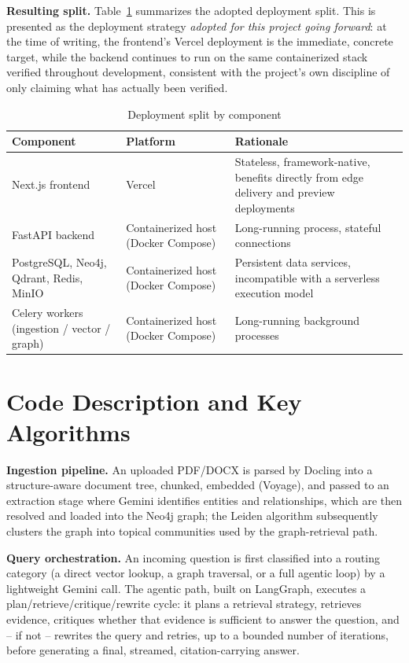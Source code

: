 \documentclass[12pt,a4paper]{report}
\begin{document}
\textbf{Resulting split.} Table~\ref{tab:deployment} summarizes the adopted
deployment split. This is presented as the deployment strategy \emph{adopted
for this project going forward}: at the time of writing, the frontend's
Vercel deployment is the immediate, concrete target, while the backend
continues to run on the same containerized stack verified throughout
development, consistent with the project's own discipline of only claiming
what has actually been verified.

\begin{table}[H]
\centering
\caption{Deployment split by component}
\label{tab:deployment}
\begin{tabularx}{\textwidth}{@{}l X l@{}}
\toprule
\textbf{Component} & \textbf{Platform} & \textbf{Rationale} \\
\midrule
Next.js frontend & Vercel & Stateless, framework-native, benefits directly from edge delivery and preview deployments \\
FastAPI backend & Containerized host (Docker Compose) & Long-running process, stateful connections \\
PostgreSQL, Neo4j, Qdrant, Redis, MinIO & Containerized host (Docker Compose) & Persistent data services, incompatible with a serverless execution model \\
Celery workers (ingestion / vector / graph) & Containerized host (Docker Compose) & Long-running background processes \\
\bottomrule
\end{tabularx}
\end{table}

\section{Code Description and Key Algorithms}
\label{sec:code-description}

\textbf{Ingestion pipeline.} An uploaded \ac{PDF}/DOCX is parsed by Docling
into a structure-aware document tree, chunked, embedded (Voyage), and passed
to an extraction stage where Gemini identifies entities and relationships,
which are then resolved and loaded into the Neo4j graph; the Leiden
algorithm subsequently clusters the graph into topical communities used by
the graph-retrieval path.

\textbf{Query orchestration.} An incoming question is first classified into
a routing category (a direct vector lookup, a graph traversal, or a full
agentic loop) by a lightweight Gemini call. The agentic path, built on
LangGraph, executes a plan/retrieve/critique/rewrite cycle: it plans a
retrieval strategy, retrieves evidence, critiques whether that evidence is
sufficient to answer the question, and -- if not -- rewrites the query and
retries, up to a bounded number of iterations, before generating a final,
streamed, citation-carrying answer.
\end{document}
